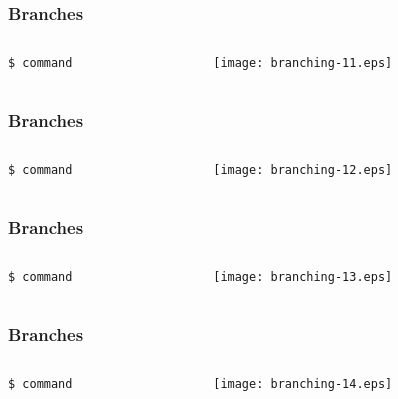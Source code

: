 \documentclass[english]{beamer}
\newcommand{\cmd}[1]{%
\texttt{\textcolor{code-orange}{#1}}%
}
\begin{document}
\begin{frame}
\frametitle{Branches}

\begin{columns}[t]
        \begin{column}[T]{.5\textwidth}
                \cmd{\$ command} \\
        \end{column}
        \begin{column}[T]{.5\textwidth}
                \texttt{[image: branching-11.eps]}
        \end{column}
\end{columns}
\end{frame}

\begin{frame}
\frametitle{Branches}

\begin{columns}[t]
        \begin{column}[T]{.5\textwidth}
                \cmd{\$ command} \\
        \end{column}
        \begin{column}[T]{.5\textwidth}
                \texttt{[image: branching-12.eps]}
        \end{column}
\end{columns}
\end{frame}

\begin{frame}
\frametitle{Branches}

\begin{columns}[t]
        \begin{column}[T]{.5\textwidth}
                \cmd{\$ command} \\
        \end{column}
        \begin{column}[T]{.5\textwidth}
                \texttt{[image: branching-13.eps]}
        \end{column}
\end{columns}
\end{frame}

\begin{frame}
\frametitle{Branches}

\begin{columns}[t]
        \begin{column}[T]{.5\textwidth}
                \cmd{\$ command} \\
        \end{column}
        \begin{column}[T]{.5\textwidth}
                \texttt{[image: branching-14.eps]}
        \end{column}
\end{columns}
\end{frame}
\end{document}
